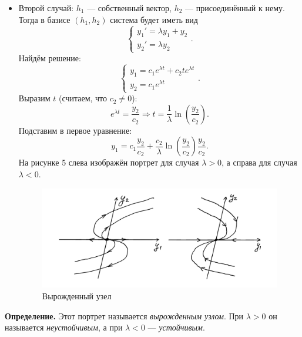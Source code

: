\begin{itemize}
\item Второй случай: $h_1$ --- собственный вектор, $h_2$ --- присоединённый к нему.
Тогда в базисе $(h_1, h_2)$ система будет иметь вид
\[
    \begin{cases}
        y_1' = \lambda y_1 + y_2 \\
        y_2' = \lambda y_2
    \end{cases}.
\]
Найдём решение:
\[
    \begin{cases}
        y_1 = c_1 e^{\lambda t} + c_2 t e^{\lambda t} \\
        y_2 = c_1 e^{\lambda t}
    \end{cases}.
\]
Выразим $t$ (считаем, что $c_2 \ne 0$):
\[
    e^{\lambda t} = \frac{y_2}{c_2} \Rightarrow t = \frac{1}{\lambda} \ln \left( \frac{y_2}{c_2} \right).
\]
Подставим в первое уравнение:
\[
    y_1 = c_1 \frac{y_2}{c_2} + \frac{c_2}{\lambda} \ln \left( \frac{y_2}{c_2} \right) \frac{y_2}{c_2}.
\]
На рисунке 5 слева изображён портрет для случая $\lambda > 0$, а справа для случая $\lambda < 0$.
\pagebreak
\begin{figure}[h]
    \includegraphics[scale=0.25]{degenerate-knot}
    \centering
    \caption{Вырожденный узел}
\end{figure}
\end{itemize}

\textbf{Определение.} Этот портрет называется \textit{вырожденным узлом}. При $\lambda > 0$ он называется \textit{неустойчивым}, а при $\lambda < 0$ --- \textit{устойчивым}.

